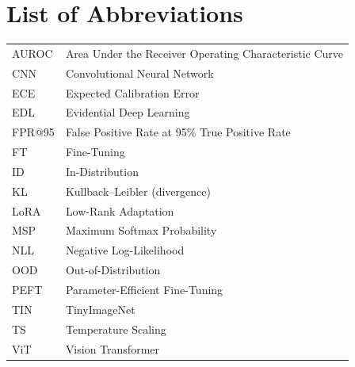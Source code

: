 \documentclass[12pt,a4paper,oneside]{report}
\begin{document}
\chapter*{List of Abbreviations}
\begin{tabular}{@{}ll@{}}
AUROC & Area Under the Receiver Operating Characteristic Curve\\
CNN   & Convolutional Neural Network\\
ECE   & Expected Calibration Error\\
EDL   & Evidential Deep Learning\\
FPR@95 & False Positive Rate at 95\% True Positive Rate\\
FT    & Fine-Tuning\\
ID    & In-Distribution\\
KL    & Kullback--Leibler (divergence)\\
LoRA  & Low-Rank Adaptation\\
MSP   & Maximum Softmax Probability\\
NLL   & Negative Log-Likelihood\\
OOD   & Out-of-Distribution\\
PEFT  & Parameter-Efficient Fine-Tuning\\
TIN   & TinyImageNet\\
TS    & Temperature Scaling\\
ViT   & Vision Transformer\\
\end{tabular}

\clearpage
{}








\clearpage
{}
{}
\renewcommand{\bibname}{References}



\appendix

\end{document}
